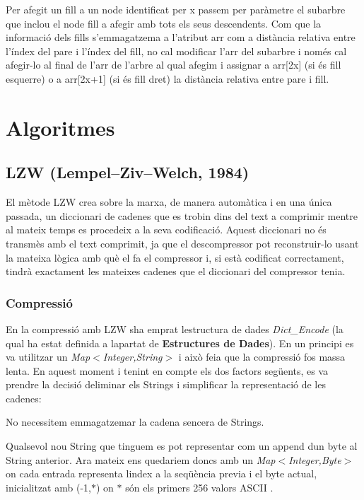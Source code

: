 Per afegit un fill a un node identificat per x passem per paràmetre el subarbre que inclou el node fill a afegir amb tots els seus descendents. Com que la informació dels fills s’emmagatzema a l’atribut arr com a distància relativa entre l’índex del pare i l’índex del fill, no cal modificar l’arr del subarbre i només cal afegir-\/lo al final de l’arr de l’arbre al qual afegim i assignar a arr\mbox{[}2x\mbox{]} (si és fill esquerre) o a arr\mbox{[}2x+1\mbox{]} (si és fill dret) la distància relativa entre pare i fill.

\section*{Algoritmes}

\subsection*{L\+ZW (Lempel–\+Ziv–\+Welch, 1984)}

El mètode L\+ZW crea sobre la marxa, de manera automàtica i en una única passada, un diccionari de cadenes que es trobin dins del text a comprimir mentre al mateix temps es procedeix a la seva codificació. Aquest diccionari no és transmès amb el text comprimit, ja que el descompressor pot reconstruir-\/lo usant la mateixa lògica amb què el fa el compressor i, si està codificat correctament, tindrà exactament les mateixes cadenes que el diccionari del compressor tenia.

\subsubsection*{Compressió}

En la compressió amb L\+ZW s\textquotesingle{}ha emprat l\textquotesingle{}estructura de dades {\itshape Dict\+\_\+\+Encode} (la qual ha estat definida a l\textquotesingle{}apartat de {\bfseries Estructures de Dades}). En un principi es va utilitzar un {\itshape Map$<$Integer,String$>$} i això feia que la compressió fos massa lenta. En aquest moment i tenint en compte els dos factors següents, es va prendre la decisió d\textquotesingle{}eliminar els Strings i simplificar la representació de les cadenes\+:
\begin{DoxyItemize}
\item No necessitem emmagatzemar la cadena sencera de Strings.
\item Qualsevol nou String que tinguem es pot representar com un append d\textquotesingle{}un byte al String anterior. Ara mateix ens quedariem doncs amb un {\itshape Map$<$Integer,Byte$>$} on cada entrada representa l\textquotesingle{}index a la seqüència previa i el byte actual, inicialitzat amb (-\/1,$\ast$) on $\ast$ són els primers 256 valors A\+S\+C\+II .
\end{DoxyItemize}

